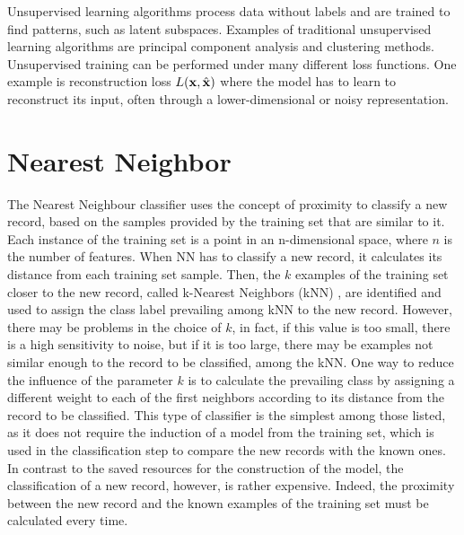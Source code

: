 \documentclass[final,a4paper,12pt,english]{UnicaPhdThesis3}
\begin{document}
Unsupervised learning algorithms process data without labels and are trained to find patterns, such as latent subspaces. Examples of traditional unsupervised learning algorithms are principal component analysis and clustering methods. Unsupervised training can be performed under many different loss functions. One example is reconstruction loss $L({\bf x}, \hat{{\bf x}})$ where the model has to learn to reconstruct its input, often through a lower-dimensional or noisy representation.

\section{Nearest Neighbor} \label{kNN}
The Nearest Neighbour classifier uses the concept of proximity to classify a new record, based on the samples provided by the training set that are similar to it. Each instance of the training set is a point in an n-dimensional space, where $n$ is the number of features. When NN has to classify a new record, it calculates its distance from each training set sample. Then, the $k$ examples of the training set closer to the new record, called k-Nearest Neighbors (k\acs{NN})  \cite{Cover}, are identified and used to assign the class label prevailing among kNN to the new record. However, there may be problems in the choice of $k$, in fact, if this value is too small, there is a high sensitivity to noise, but if it is too large, there may be examples not similar enough to the record to be classified, among the kNN. One way to reduce the influence of the parameter $k$ is to calculate the prevailing class by assigning a different weight to each of the first neighbors according to its distance from the record to be classified. This type of classifier is the simplest among those listed, as it does not require the induction of a model from the training set, which is used in the classification step to compare the new records with the known ones. In contrast to the saved resources for the construction of the model, the classification of a new record, however, is rather expensive. Indeed, the proximity between the new record and the known examples of the training set must be calculated every time.
\end{document}

